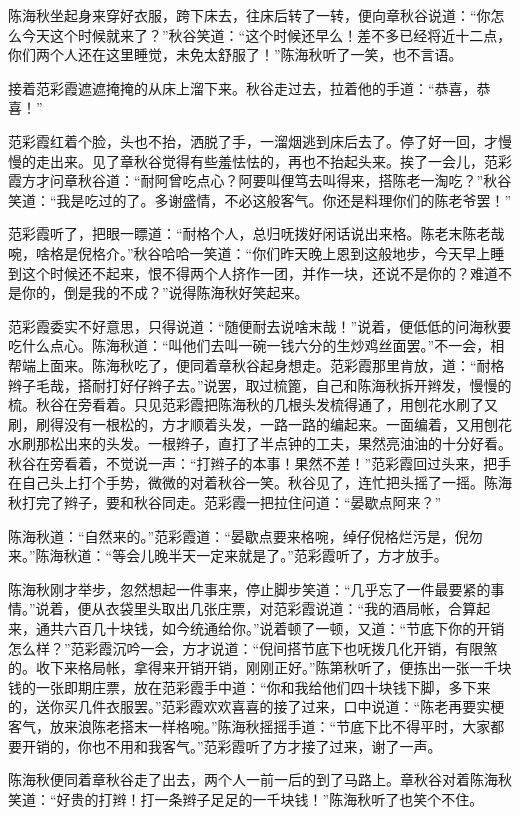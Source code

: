 \documentclass[12pt,UTF8]{ctexbook}
\begin{document}
{{{陈海秋坐起身来穿好衣服，跨下床去，往床后转了一转，便向章秋谷说道：“你怎么今天这个时候就来了？”秋谷笑道：“这个时候还早么！差不多已经将近十二点，你们两个人还在这里睡觉，未免太舒服了！”陈海秋听了一笑，也不言语。

接着范彩霞遮遮掩掩的从床上溜下来。秋谷走过去，拉着他的手道：“恭喜，恭喜！”

范彩霞红着个脸，头也不抬，洒脱了手，一溜烟逃到床后去了。停了好一回，才慢慢的走出来。见了章秋谷觉得有些羞怯怯的，再也不抬起头来。挨了一会儿，范彩霞方才问章秋谷道：“耐阿曾吃点心？阿要叫俚笃去叫得来，搭陈老一淘吃？”秋谷笑道：“我是吃过的了。多谢盛情，不必这般客气。你还是料理你们的陈老爷罢！”

范彩霞听了，把眼一瞟道：“耐格个人，总归呒拨好闲话说出来格。陈老末陈老哉啘，啥格是倪格介。”秋谷哈哈一笑道：“你们昨天晚上恩到这般地步，今天早上睡到这个时候还不起来，恨不得两个人挤作一团，并作一块，还说不是你的？难道不是你的，倒是我的不成？”说得陈海秋好笑起来。

范彩霞委实不好意思，只得说道：“随便耐去说啥末哉！”说着，便低低的问海秋要吃什么点心。陈海秋道：“叫他们去叫一碗一钱六分的生炒鸡丝面罢。”不一会，相帮端上面来。陈海秋吃了，便同着章秋谷起身想走。范彩霞那里肯放，道：“耐格辫子毛哉，搭耐打好仔辫子去。”说罢，取过梳篦，自己和陈海秋拆开辫发，慢慢的梳。秋谷在旁看着。只见范彩霞把陈海秋的几根头发梳得通了，用刨花水刷了又刷，刷得没有一根松的，方才顺着头发，一路一路的编起来。一面编着，又用刨花水刷那松出来的头发。一根辫子，直打了半点钟的工夫，果然亮油油的十分好看。秋谷在旁看着，不觉说一声：“打辫子的本事！果然不差！”范彩霞回过头来，把手在自己头上打个手势，微微的对着秋谷一笑。秋谷见了，连忙把头摇了一摇。陈海秋打完了辫子，要和秋谷同走。范彩霞一把拉住问道：“晏歇点阿来？”

陈海秋道：“自然来的。”范彩霞道：“晏歇点要来格啘，绰仔倪格烂污是，倪勿来。”陈海秋道：“等会儿晚半天一定来就是了。”范彩霞听了，方才放手。

陈海秋刚才举步，忽然想起一件事来，停止脚步笑道：“几乎忘了一件最要紧的事情。”说着，便从衣袋里头取出几张庄票，对范彩霞说道：“我的酒局帐，合算起来，通共六百几十块钱，如今统通给你。”说着顿了一顿，又道：“节底下你的开销怎么样？”范彩霞沉吟一会，方才说道：“倪间搭节底下也呒拨几化开销，有限煞的。收下来格局帐，拿得来开销开销，刚刚正好。”陈第秋听了，便拣出一张一千块钱的一张即期庄票，放在范彩霞手中道：“你和我给他们四十块钱下脚，多下来的，送你买几件衣服罢。”范彩霞欢欢喜喜的接了过来，口中说道：“陈老再要实梗客气，放来浪陈老搭末一样格啘。”陈海秋摇摇手道：“节底下比不得平时，大家都要开销的，你也不用和我客气。”范彩霞听了方才接了过来，谢了一声。

陈海秋便同着章秋谷走了出去，两个人一前一后的到了马路上。章秋谷对着陈海秋笑道：“好贵的打辫！打一条辫子足足的一千块钱！”陈海秋听了也笑个不住。

}}}
\end{document}
